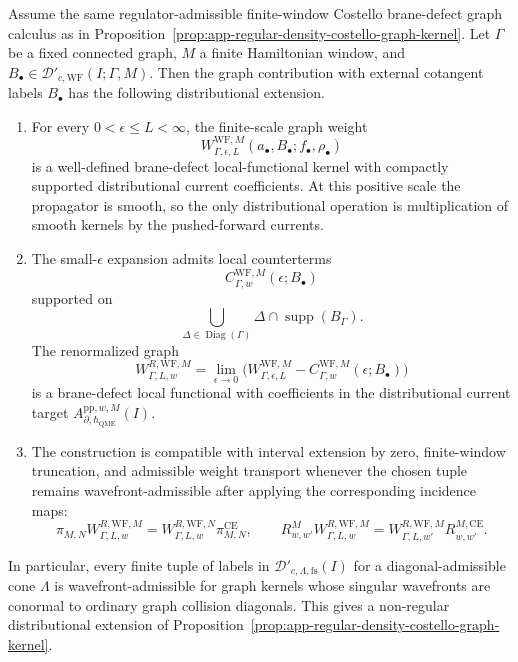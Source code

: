 \begin{prop}
\label{prop:app-wavefront-admissible-costello-graph-kernel}
  Assume the same regulator-admissible finite-window Costello
  brane-defect graph calculus as in
  Proposition~\ref{prop:app-regular-density-costello-graph-kernel}.  Let
  \(\Gamma\) be a fixed connected graph, \(M\) a finite Hamiltonian window,
  and \(B_\bullet\in
  \mathcal D'_{c,\mathrm{WF}}(I;\Gamma,M)\).  Then the graph contribution
  with external cotangent labels \(B_\bullet\) has the following
  distributional extension.
  \begin{enumerate}
    \item For every \(0<\epsilon\leq L<\infty\), the finite-scale graph
    weight
    \[
      W^{\mathrm{WF},M}_{\Gamma,\epsilon,L}
        (a_\bullet,B_\bullet;f_\bullet,\rho_\bullet)
    \]
    is a well-defined brane-defect local-functional kernel with compactly
    supported distributional current coefficients.  At this positive
    scale the propagator is smooth, so the only distributional operation
    is multiplication of smooth kernels by the pushed-forward currents.
    \item The small-\(\epsilon\) expansion admits local counterterms
    \[
      C_{\Gamma,w}^{\mathrm{WF},M}(\epsilon;B_\bullet)
    \]
    supported on
    \[
      \bigcup_{\Delta\in\operatorname{Diag}(\Gamma)}
      \Delta\cap\operatorname{supp}(B_\Gamma).
    \]
    The renormalized graph
    \[
      W^{R,\mathrm{WF},M}_{\Gamma,L,w}
        =
        \lim_{\epsilon\to0}
        \bigl(
          W^{\mathrm{WF},M}_{\Gamma,\epsilon,L}
          -
          C_{\Gamma,w}^{\mathrm{WF},M}(\epsilon;B_\bullet)
        \bigr)
    \]
    is a brane-defect local functional with coefficients in the
    distributional current target
    \(A_{\partial,\hbar_{\mathrm{QME}}}^{\mathrm{pp},w,M}(I)\).
    \item The construction is compatible with interval extension by zero,
    finite-window truncation, and admissible weight transport whenever
    the chosen tuple remains wavefront-admissible after applying the
    corresponding incidence maps:
    \[
      \pi_{M,N}W^{R,\mathrm{WF},M}_{\Gamma,L,w}
        =
      W^{R,\mathrm{WF},N}_{\Gamma,L,w}\pi^{\mathrm{CE}}_{M,N},
      \qquad
      R^M_{w,w'}W^{R,\mathrm{WF},M}_{\Gamma,L,w}
        =
      W^{R,\mathrm{WF},M}_{\Gamma,L,w'}R^{M,\mathrm{CE}}_{w,w'} .
    \]
  \end{enumerate}
  In particular, every finite tuple of labels in
  \(\mathcal D'_{c,\Lambda,\mathrm{fs}}(I)\) for a diagonal-admissible
  cone \(\Lambda\) is wavefront-admissible for graph kernels whose
  singular wavefronts are conormal to ordinary graph collision
  diagonals.  This gives a non-regular distributional extension of
  Proposition~\ref{prop:app-regular-density-costello-graph-kernel}.


\end{prop}
